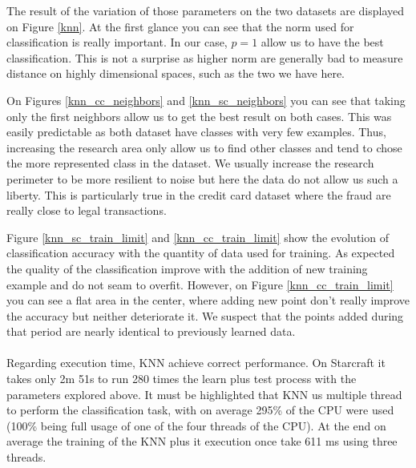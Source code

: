 \documentclass[twocolumn,a4paper,10pt]{article}
\begin{document}
The result of the variation of those parameters on the two datasets
are displayed on Figure \ref{knn}. At the first glance you can see
that the norm used for classification is really important. In our
case, $p=1$ allow us to have the best classification. This is not
a surprise as higher norm are generally bad to measure distance on
highly dimensional spaces, such as the two we have here.

On Figures \ref{knn_cc_neighbors} and \ref{knn_sc_neighbors} you
can see that taking only the first neighbors allow us to get the best
result on both cases. This was easily predictable as both dataset
have classes with very few examples. Thus, increasing the research
area only allow us to find other classes and tend to chose the
more represented class in the dataset. We usually increase the research
perimeter to be more resilient to noise but here the data do not allow
us such a liberty. This is particularly true in the credit card dataset
where the fraud are really close to legal transactions.

Figure \ref{knn_sc_train_limit} and \ref{knn_cc_train_limit} show
the evolution of classification accuracy with the quantity of data
used for training. As expected the quality of the classification improve
with the addition of new training example and do not seam to overfit.
However, on Figure \ref{knn_cc_train_limit} you can see a flat area
in the center, where adding new point don't really improve the accuracy
but neither deteriorate it. We suspect that the points added during
that period are nearly identical to previously learned data.

\paragraph{}

Regarding execution time, KNN achieve correct performance. On Starcraft
it takes only 2m 51s to run 280 times the learn plus test process
with the parameters explored above. It must be highlighted that KNN
us multiple thread to perform the classification task, with on average
295\% of the CPU were used (100\% being full usage of one of the four
threads of the CPU). At the end on average the training of the KNN
plus it execution once take 611 ms using three threads.

\paragraph{}
\end{document}
